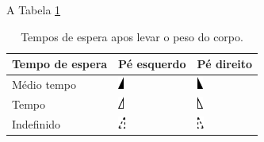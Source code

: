 A Tabela \ref{tab:simbolospe}
\begin{table}[!hbt]
\caption{Tempos de espera apos levar o peso do corpo.}
\begin{center}
\begin{tabular}{|l |l | l |}
\hline
Tempo de espera  & Pé esquerdo & Pé direito \\
\hline
\hline
Médio tempo  & 
\includegraphics[height=11pt]{chapters/cap-partituramov/torso-pe-esquerdo-contratempo.eps}   & 
\includegraphics[height=11pt]{chapters/cap-partituramov/torso-pe-direito-contratempo.eps}   \\
\hline
Tempo  & 
\includegraphics[height=11pt]{chapters/cap-partituramov/torso-pe-esquerdo-tempo.eps}   & 
\includegraphics[height=11pt]{chapters/cap-partituramov/torso-pe-direito-tempo.eps}   \\
\hline
Indefinido & 
\includegraphics[height=11pt]{chapters/cap-partituramov/torso-pe-esquerdo-indef.eps}   & 
\includegraphics[height=11pt]{chapters/cap-partituramov/torso-pe-direito-indef.eps}   \\
\hline
\hline
\end{tabular}
\end{center}
\label{tab:simbolospe}
\end{table}
